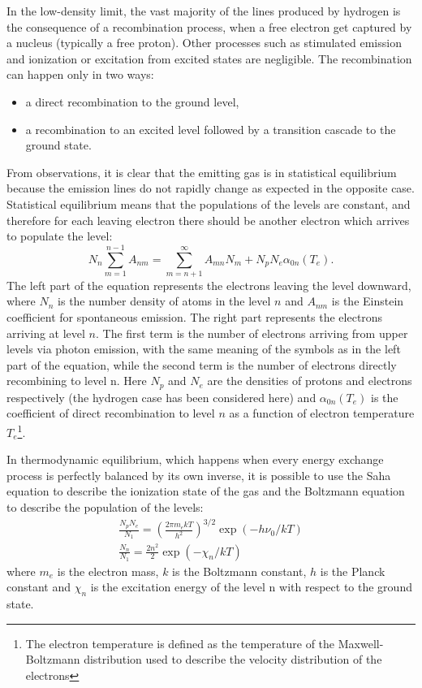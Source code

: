 \documentclass[../main.tex]{subfiles}
\begin{document}
In the low-density limit, the vast majority of the lines produced by hydrogen is the consequence of a recombination process, when a free electron get captured by a nucleus (typically a free proton).
Other processes such as stimulated emission and ionization or excitation from excited states are negligible.
The recombination can happen only in two ways: 
\begin{itemize}
    \item a direct recombination to the ground level,
    \item a recombination to an excited level followed by a transition cascade to the ground state.
\end{itemize}
From observations, it is clear that the emitting gas is in statistical equilibrium because the emission lines do not rapidly change as expected in the opposite case.
Statistical equilibrium means that the populations of the levels are constant, and therefore for each leaving electron there should be another electron which arrives to populate the level:
\begin{equation}
    \label{eq:statistical_eq}
    N_n\sum\limits_{m=1}^{n-1} A_{nm} = \sum\limits_{m=n+1}^{\infty} A_{mn}N_m + N_pN_e\alpha_{0n}(T_e).
\end{equation}
The left part of the equation represents the electrons leaving the level downward, where $N_n$ is the number density of atoms in the level $n$ and $A_{nm}$ is the Einstein coefficient for spontaneous emission.
The right part represents the electrons arriving at level $n$. 
The first term is the number of electrons arriving from upper levels via photon emission, with the same meaning of the symbols as in the left part of the equation, while the second term is the number of electrons directly recombining to level n.
Here $N_p$ and $N_e$ are the densities of protons and electrons respectively (the hydrogen case has been considered here) and $\alpha_{0n}(T_e)$ is the coefficient of direct recombination to level $n$ as a function of electron temperature $T_e$\footnote{The electron temperature is defined as the temperature of the Maxwell-Boltzmann distribution used to describe the velocity distribution of the electrons}.

In thermodynamic equilibrium, which happens when every energy exchange process is perfectly balanced by its own inverse, it is possible to use the Saha equation to describe the ionization state of the gas and the Boltzmann equation to describe the population of the levels:
\begin{gather}
    \label{eq:saha}
    \frac{N_pN_e}{N_1} = \left(\frac{2\pi m_e k T}{h^2}\right)^{3/2}\exp(-h\nu_0/kT)\\
    \label{eq:bolt}
    \frac{N_n}{N_1} = \frac{2n^2}{2} \exp(-\chi_n/kT)
\end{gather}
where $m_e$ is the electron mass, $k$ is the Boltzmann constant, $h$ is the Planck constant and $\chi_n$ is the excitation energy of the level n with respect to the ground state.
\end{document}
